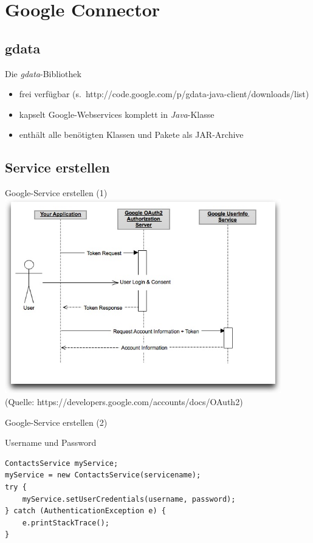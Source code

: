 \section{Google Connector}
\subsection*{gdata}

\begin{frame}{Die \emph{gdata}-Bibliothek}
 \begin{itemize}
 	\item frei verfügbar (s.\ http://code.google.com/p/gdata-java-client/downloads/list)
 	\item kapselt Google-Webservices komplett in \emph{Java}-Klasse
 	\item enthält alle benötigten Klassen und Pakete als JAR-Archive
 \end{itemize}
\end{frame}

\subsection*{Service erstellen}

\begin{frame}[fragile]{Google-Service erstellen (1)}
\includegraphics[width=0.9\textwidth]{Bilder/googleOauth.jpg}\\
(Quelle: https://developers.google.com/accounts/docs/OAuth2)
\end{frame}

\begin{frame}[fragile]{Google-Service erstellen (2)}
\begin{block}{Username und Password}
\javalstset
\begin{lstlisting}
ContactsService myService;
myService = new ContactsService(servicename);
try {
	myService.setUserCredentials(username, password);
} catch (AuthenticationException e) {
	e.printStackTrace();
}
\end{lstlisting}
\end{block}
\end{frame}

